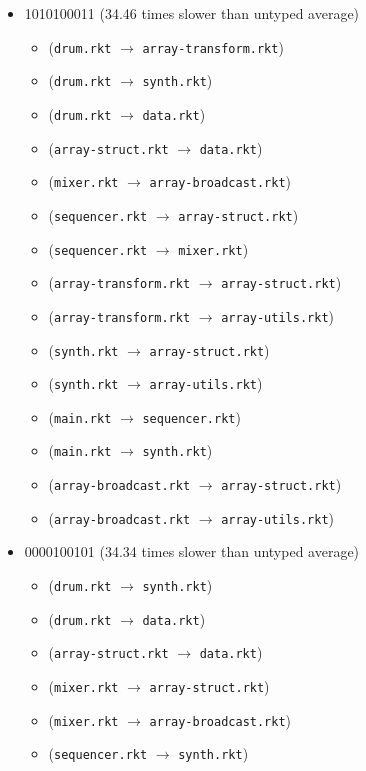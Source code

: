 \documentclass{article}
\newcommand{\mono}[1]{\texttt{#1}}
\begin{document}
\begin{itemize}
\begin{itemize}
  \end{itemize}
\item 1010100011 (34.46 times slower than untyped average)
  \begin{itemize}
  \item (\mono{drum.rkt} $\rightarrow$ \mono{array-transform.rkt})
  \item (\mono{drum.rkt} $\rightarrow$ \mono{synth.rkt})
  \item (\mono{drum.rkt} $\rightarrow$ \mono{data.rkt})
  \item (\mono{array-struct.rkt} $\rightarrow$ \mono{data.rkt})
  \item (\mono{mixer.rkt} $\rightarrow$ \mono{array-broadcast.rkt})
  \item (\mono{sequencer.rkt} $\rightarrow$ \mono{array-struct.rkt})
  \item (\mono{sequencer.rkt} $\rightarrow$ \mono{mixer.rkt})
  \item (\mono{array-transform.rkt} $\rightarrow$ \mono{array-struct.rkt})
  \item (\mono{array-transform.rkt} $\rightarrow$ \mono{array-utils.rkt})
  \item (\mono{synth.rkt} $\rightarrow$ \mono{array-struct.rkt})
  \item (\mono{synth.rkt} $\rightarrow$ \mono{array-utils.rkt})
  \item (\mono{main.rkt} $\rightarrow$ \mono{sequencer.rkt})
  \item (\mono{main.rkt} $\rightarrow$ \mono{synth.rkt})
  \item (\mono{array-broadcast.rkt} $\rightarrow$ \mono{array-struct.rkt})
  \item (\mono{array-broadcast.rkt} $\rightarrow$ \mono{array-utils.rkt})
  \end{itemize}
\item 0000100101 (34.34 times slower than untyped average)
  \begin{itemize}
  \item (\mono{drum.rkt} $\rightarrow$ \mono{synth.rkt})
  \item (\mono{drum.rkt} $\rightarrow$ \mono{data.rkt})
  \item (\mono{array-struct.rkt} $\rightarrow$ \mono{data.rkt})
  \item (\mono{mixer.rkt} $\rightarrow$ \mono{array-struct.rkt})
  \item (\mono{mixer.rkt} $\rightarrow$ \mono{array-broadcast.rkt})
  \item (\mono{sequencer.rkt} $\rightarrow$ \mono{synth.rkt})

\end{itemize}
\end{itemize}
\end{document}

